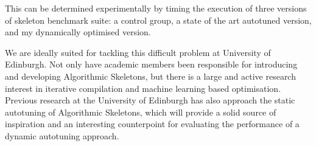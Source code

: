 This can be determined experimentally by timing the execution of three
versions of skeleton benchmark suite: a control group, a state of the
art autotuned version, and my dynamically optimised version.


We are ideally suited for tackling this difficult problem at
University of Edinburgh. Not only have academic members been
responsible for introducing and developing Algorithmic Skeletons, but
there is a large and active research interest in iterative compilation
and machine learning based optimisation. Previous research at the
University of Edinburgh has also approach the static autotuning of
Algorithmic Skeletons, which will provide a solid source of
inspiration and an interesting counterpoint for evaluating the
performance of a dynamic autotuning approach.



